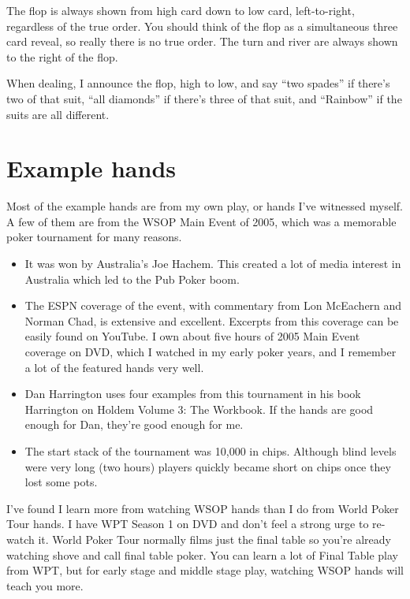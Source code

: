 The flop is always shown from high card down to low card, left-to-right,
regardless of the true order. You should think of the flop as a
simultaneous three card reveal, so really there is no true order. The turn
and river are always shown to the right of the flop.

When dealing, I announce the flop, high to low, and say ``two spades''
if there's two of that suit, ``all diamonds'' if there's three of that
suit, and ``Rainbow'' if the suits are all different.


\section*{Example hands}

Most of the example hands are from my own play, or hands I've
witnessed myself. A few of them are from the WSOP Main Event
of 2005, which was a memorable poker tournament for many reasons.

\begin{itemize}
  \item It was won by Australia's Joe Hachem. This created a lot of
    media interest in Australia which led to the Pub Poker boom.
  \item The ESPN coverage of the event, with commentary from
    Lon McEachern and Norman Chad, is extensive and
    excellent. Excerpts from this coverage can be easily found on
    YouTube. I own about five hours of 2005 Main Event coverage on
    DVD, which I watched in my early poker years, and I remember a lot
    of the featured hands very well.
  \item Dan Harrington uses four examples from this tournament in his
    book Harrington on Holdem Volume 3: The Workbook. If the hands are
    good enough for Dan, they're good enough for me.
  \item The start stack of the tournament was 10,000 in
    chips. Although blind levels were very long (two hours)
    players quickly became short on chips once they lost some pots.
\end{itemize}

I've found I learn more from watching WSOP hands than I do
from World Poker Tour hands. I have WPT Season 1 on DVD and don't feel
a strong urge to re-watch it. World Poker Tour normally films just the
final table so you're already watching shove and call final table
poker. You can learn a lot of Final Table play from WPT, but for early
stage and middle stage play, watching WSOP hands will teach you more.
